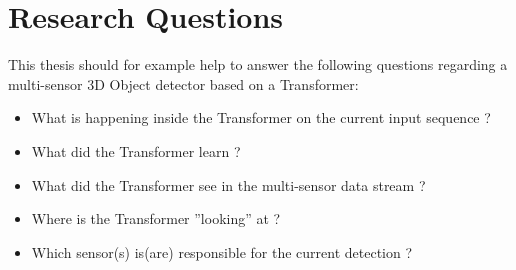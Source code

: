 \chapter{Research Questions}
\label{ch:rq}
This thesis should for example help to answer the following questions regarding a multi-sensor 3D Object detector based on a Transformer:
\begin{itemize}
    \item What is happening inside the Transformer on the current input sequence ?
    \item What did the Transformer learn ?
    \item What did the Transformer see in the multi-sensor data stream ?
    \item Where is the Transformer ”looking” at ?
    \item Which sensor(s) is(are) responsible for the current detection ?
  \end{itemize}